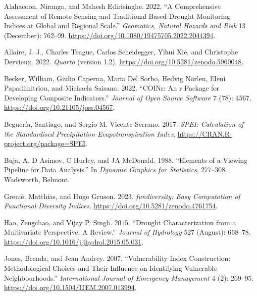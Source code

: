 \documentclass[
]{interact}
\newlength{\cslhangindent}
\newlength{\cslentryspacingunit} %
\newenvironment{CSLReferences}[2] %
 {%
  \setlength{\parindent}{0pt}
  \ifodd #1
  \let\oldpar\par
  \def\par{\hangindent=\cslhangindent\oldpar}
  \fi
  \setlength{\parskip}{#2\cslentryspacingunit}
 }%
 {}
\begin{document}
\hypertarget{refs}{}
\begin{CSLReferences}{1}{0}
\leavevmode{}%
Alahacoon, Niranga, and Mahesh Edirisinghe. 2022. {``A Comprehensive
Assessment of Remote Sensing and Traditional Based Drought Monitoring
Indices at Global and Regional Scale.''} \emph{Geomatics, Natural
Hazards and Risk} 13 (December): 762--99.
\url{https://doi.org/10.1080/19475705.2022.2044394}.

\leavevmode{}%
Allaire, J. J., Charles Teague, Carlos Scheidegger, Yihui Xie, and
Christophe Dervieux. 2022. \emph{{Quarto}} (version 1.2).
\url{https://doi.org/10.5281/zenodo.5960048}.

\leavevmode{}%
Becker, William, Giulio Caperna, Maria Del Sorbo, Hedvig Norlen, Eleni
Papadimitriou, and Michaela Saisana. 2022. {``COINr: An r Package for
Developing Composite Indicators.''} \emph{Journal of Open Source
Software} 7 (78): 4567. \url{https://doi.org/10.21105/joss.04567}.

\leavevmode{}%
Beguería, Santiago, and Sergio M. Vicente-Serrano. 2017. \emph{SPEI:
Calculation of the Standardised Precipitation-Evapotranspiration Index}.
\url{https://CRAN.R-project.org/package=SPEI}.

\leavevmode{}%
Buja, A, D Asimov, C Hurley, and JA McDonald. 1988. {``Elements of a
Viewing Pipeline for Data Analysis.''} In \emph{Dynamic Graphics for
Statistics}, 277--308. Wadsworth, Belmont.

\leavevmode{}%
Grenié, Matthias, and Hugo Gruson. 2023. \emph{{fundiversity}: Easy
Computation of Functional Diversity Indices}.
\url{https://doi.org/10.5281/zenodo.4761754}.

\leavevmode{}%
Hao, Zengchao, and Vijay P. Singh. 2015. {``Drought Characterization
from a Multivariate Perspective: {A} Review.''} \emph{Journal of
Hydrology} 527 (August): 668--78.
\url{https://doi.org/10.1016/j.jhydrol.2015.05.031}.

\leavevmode{}%
Jones, Brenda, and Jean Andrey. 2007. {``Vulnerability Index
Construction: Methodological Choices and Their Influence on Identifying
Vulnerable Neighbourhoods.''} \emph{International Journal of Emergency
Management} 4 (2): 269--95.
\url{https://doi.org/10.1504/IJEM.2007.013994}.


\end{CSLReferences}
\end{document}
